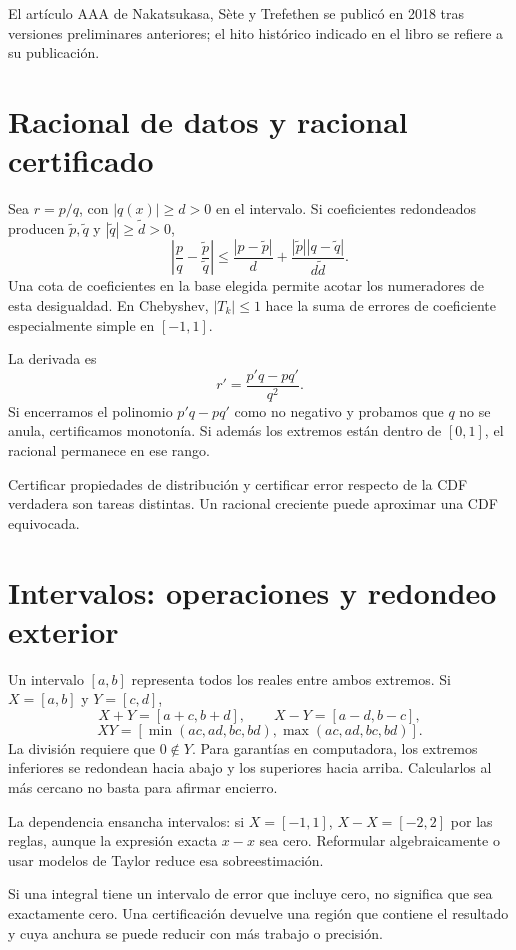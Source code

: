 \documentclass[11pt,a4paper]{article}
\theoremstyle{definition}
\begin{document}
El artículo AAA de Nakatsukasa, Sète y Trefethen se publicó en 2018 tras versiones preliminares anteriores; el hito histórico indicado en el libro se refiere a su publicación.

\section{Racional de datos y racional certificado}
Sea $r=p/q$, con $|q(x)|\ge d>0$ en el intervalo. Si coeficientes redondeados producen $\widetilde p,\widetilde q$ y $|\widetilde q|\ge\widetilde d>0$,
\[
\left|\frac pq-\frac{\widetilde p}{\widetilde q}\right|
\le\frac{|p-\widetilde p|}{d}
+\frac{|\widetilde p||q-\widetilde q|}{d\widetilde d}.
\]
Una cota de coeficientes en la base elegida permite acotar los numeradores de esta desigualdad. En Chebyshev, $|T_k|\le1$ hace la suma de errores de coeficiente especialmente simple en $[-1,1]$.

La derivada es
\[
r'=\frac{p'q-pq'}{q^2}.
\]
Si encerramos el polinomio $p'q-pq'$ como no negativo y probamos que $q$ no se anula, certificamos monotonía. Si además los extremos están dentro de $[0,1]$, el racional permanece en ese rango.

Certificar propiedades de distribución y certificar error respecto de la CDF verdadera son tareas distintas. Un racional creciente puede aproximar una CDF equivocada.

\section{Intervalos: operaciones y redondeo exterior}
Un intervalo $[a,b]$ representa todos los reales entre ambos extremos. Si $X=[a,b]$ y $Y=[c,d]$,
\[
X+Y=[a+c,b+d],\qquad X-Y=[a-d,b-c],
\]
\[
XY=[\min(ac,ad,bc,bd),\max(ac,ad,bc,bd)].
\]
La división requiere que $0\notin Y$. Para garantías en computadora, los extremos inferiores se redondean hacia abajo y los superiores hacia arriba. Calcularlos al más cercano no basta para afirmar encierro.

La dependencia ensancha intervalos: si $X=[-1,1]$, $X-X=[-2,2]$ por las reglas, aunque la expresión exacta $x-x$ sea cero. Reformular algebraicamente o usar modelos de Taylor reduce esa sobreestimación.

Si una integral tiene un intervalo de error que incluye cero, no significa que sea exactamente cero. Una certificación devuelve una región que contiene el resultado y cuya anchura se puede reducir con más trabajo o precisión.
\end{document}

